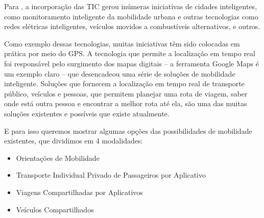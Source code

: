 Para , a incorporação das TIC gerou inúmeras iniciativas de cidades inteligentes, como monitoramento inteligente da mobilidade urbana e outras tecnologias como redes elétricas inteligentes, veículos movidos a combustíveis alternativos, e outros.

Como exemplo dessas tecnologias, muitas iniciativas têm sido colocadas em prática por meio do GPS. A tecnologia que permite a localização em tempo real foi responsável pelo surgimento dos mapas digitais – a ferramenta Google Maps é um exemplo claro – que desencadeou uma série de soluções de mobilidade inteligente. Soluções que fornecem a localização em tempo real de transporte público, veículos e pessoas, que permitem planejar uma rota de viagem, saber onde está outra pessoa e encontrar a melhor rota até ela, são uma das muitas soluções existentes e possíveis que existe atualmente.

E para isso queremos mostrar algumas opções das possibilidades de mobilidade existentes, que dividimos em 4 modalidades:
\begin{itemize}
	\item Orientações de Mobilidade
	\item Transporte Individual Privado de Passageiros por Aplicativo
	\item Viagens Compartilhadas por Aplicativos
	\item Veículos Compartilhados
\end{itemize}

